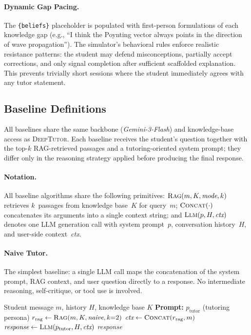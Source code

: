 \paragraph{Dynamic Gap Pacing.}
The \texttt{\{beliefs\}} placeholder is populated with first-person formulations of each knowledge gap (e.g., ``I think the Poynting vector always points in the direction of wave propagation'').
The simulator's behavioral rules enforce realistic resistance patterns: the student may defend misconceptions, partially accept corrections, and only signal completion after sufficient scaffolded explanation.
This prevents trivially short sessions where the student immediately agrees with any tutor statement.

\subsection{Baseline Definitions}
\label{app:eval:baselines}

All baselines share the same backbone (\emph{Gemini-3-Flash}) and knowledge-base access as \textsc{DeepTutor}.
Each baseline receives the student's question together with the top-$k$ RAG-retrieved passages and a tutoring-oriented system prompt; they differ only in the reasoning strategy applied before producing the final response.

\paragraph{Notation.}
All baseline algorithms share the following primitives:
$\textsc{Rag}(m, K, \textit{mode}, k)$ retrieves $k$~passages from knowledge base~$K$ for query~$m$;
$\textsc{Concat}(\cdot)$ concatenates its arguments into a single context string; and
$\textsc{Llm}(p, H, \textit{ctx})$ denotes one LLM generation call with system prompt~$p$, conversation history~$H$, and user-side context~\textit{ctx}.

\paragraph{Naive Tutor.}
The simplest baseline: a single LLM call maps the concatenation of the system prompt, RAG context, and user question directly to a response.
No intermediate reasoning, self-critique, or tool use is involved.

\begin{algorithm}[ht!]
\caption{Naive Tutor}\label{alg:naive}
\small
\begin{algorithmic}[1]
\Require Student message $m$, history $H$, knowledge base $K$
\Statex \textbf{Prompt:} $p_{\text{tutor}}$ (tutoring persona)
\State $r_{\text{rag}} \gets \textsc{Rag}(m, K, \textit{naive}, k{=}2)$
\State $\textit{ctx} \gets \textsc{Concat}(r_{\text{rag}}, m)$
\State $\textit{response} \gets \textsc{Llm}(p_{\text{tutor}}, H, \textit{ctx})$
\State \Return \textit{response}
\end{algorithmic}
\end{algorithm}

